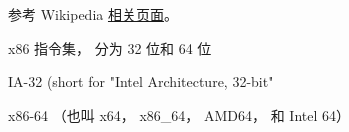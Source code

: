 
\begin{issues}
\issueDraft
\end{issues}

参考 Wikipedia \href{https://en.wikipedia.org/wiki/X86-64}{相关页面}。

x86 指令集， 分为 32 位和 64 位

IA-32 (short for "Intel Architecture, 32-bit"

x86-64 （也叫 x64， x86_64， AMD64， 和 Intel 64）

